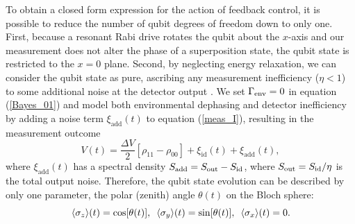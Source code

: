 To obtain a closed form expression for the action of feedback control, it is possible to reduce the number of qubit degrees of freedom down to only one.  First, because a resonant Rabi drive rotates the qubit about the $x$-axis and our measurement does not alter the phase of a superposition state, the qubit state is restricted to the $x=0$ plane. Second, by neglecting energy relaxation, we can consider the qubit state as pure, ascribing any measurement inefficiency ($\eta<1$) to some additional noise at the detector output \cite{Kor-nonideal}.  We set $\Gamma_{\rm env}=0$ in equation (\ref{Bayes_01}) and model both environmental dephasing and detector inefficiency by adding a noise term $\xi_{\mathrm{add}}(t)$ to equation (\ref{meas_I}), resulting in the measurement outcome
\begin{equation}
V(t) = \frac{\Delta V}{2} [\rho_{11}-\rho_{00}] + \xi_{\mathrm{id}}(t) + \xi_{\mathrm{add}}(t),
\label{meas_I_analytic}
\end{equation}
where $\xi_{\mathrm{add}}(t)$ has a spectral density $S_{\mathrm{add}} = S_{\rm out} - S_{\rm id}$, where $S_{\rm out} = S_{\rm id}/\eta$ is the total output noise. Therefore, the qubit state evolution can be described by only one parameter, the polar (zenith) angle $\theta(t)$ on the Bloch sphere:
\begin{equation}
\langle\sigma_z\rangle(t)= \cos [\theta(t)], \,\,\, \langle\sigma_y\rangle(t)=\sin[\theta(t)], \,\,\, \langle\sigma_x\rangle(t)=0.
\end{equation}

